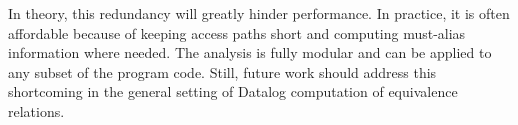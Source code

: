 In theory, this redundancy will greatly hinder performance. In practice, it 
is often affordable because of keeping access paths short and computing
must-alias information where needed. The analysis is fully modular and can be
applied to any subset of the program code. Still, future work should address
this shortcoming in the general setting of Datalog computation of equivalence
relations.








